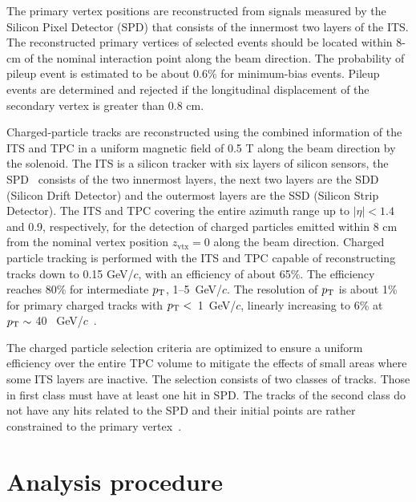 The primary vertex positions are reconstructed from signals measured by the Silicon Pixel Detector (SPD) that consists of the innermost two layers of the ITS. The reconstructed primary vertices of selected events should be located within 8-cm of the nominal interaction point along the beam direction. The probability of pileup event is estimated to be about 0.6\% for minimum-bias events. Pileup events are determined and rejected if the longitudinal displacement of the secondary vertex is greater than 0.8 cm. 

Charged-particle tracks are reconstructed using the combined information of the ITS and TPC in a uniform magnetic field of 0.5 T along the beam direction by the solenoid. The ITS is a silicon tracker with six layers of silicon sensors, the SPD~\cite{Santoro2009:ALICESPD} consists of the two innermost layers, the next two layers are the SDD (Silicon Drift Detector) and the outermost layers are the SSD (Silicon Strip Detector). The ITS and TPC covering the entire azimuth range up to $|\eta|<1.4$ and 0.9, respectively, for the detection of charged particles emitted within 8 cm from the nominal vertex position $z_\mathrm{vtx}=0$ along the beam direction. Charged particle tracking is performed with the ITS and TPC capable of reconstructing tracks down to 0.15 GeV/$c$, with an efficiency of about 65\%. The efficiency reaches 80\% for intermediate $p_\mathrm{T}$, 1--5~GeV/$c$. The resolution of $p_\mathrm{T}$ is about 1\% for primary charged tracks with $p_\mathrm{T}<$~1~GeV/$c$, linearly increasing to 6\% at $p_\mathrm{T}\sim$ 40~ GeV/$c$~\cite{Contin_2012:ITSPTRES}. 

The charged particle selection criteria are optimized to ensure a uniform efficiency over the entire TPC volume to mitigate the effects of small areas where some ITS layers are inactive. The selection consists of two classes of tracks. Those in first class must have at least one hit in SPD. The tracks of the second class do not have any hits related to the SPD and their initial points are rather constrained to the primary vertex~\cite{Adam:2015ewa}. 

\section{Analysis procedure}
\label{sec:ana}
